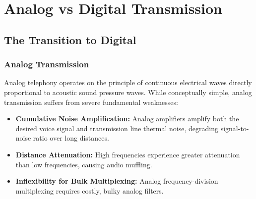 \documentclass[12pt,a4paper]{report}
\begin{document}
\chapter{Analog vs Digital Transmission}

\section{The Transition to Digital}
\subsection{Analog Transmission}
Analog telephony operates on the principle of continuous electrical waves directly proportional to acoustic sound pressure waves. While conceptually simple, analog transmission suffers from severe fundamental weaknesses:
\begin{itemize}
    \item \textbf{Cumulative Noise Amplification:} Analog amplifiers amplify both the desired voice signal and transmission line thermal noise, degrading signal-to-noise ratio over long distances.
    \item \textbf{Distance Attenuation:} High frequencies experience greater attenuation than low frequencies, causing audio muffling.
    \item \textbf{Inflexibility for Bulk Multiplexing:} Analog frequency-division multiplexing requires costly, bulky analog filters.
\end{itemize}
\end{document}
